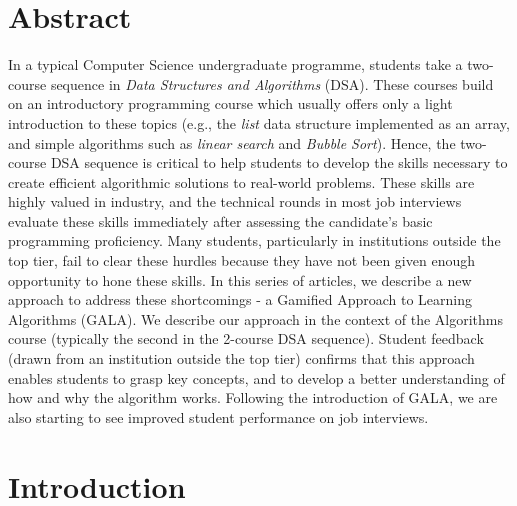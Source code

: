 \begin{multicols}{2}

\section*{Abstract}

In a typical Computer Science undergraduate programme, students take a two-course sequence in \textit{Data Structures and Algorithms} (DSA). These courses build on an introductory programming course which usually offers only a light introduction to these topics (e.g., the \textit{list} data structure implemented as an array, and simple algorithms such as \textit{linear search} and \textit{Bubble Sort}). Hence, the two-course DSA sequence is critical to help students to develop the skills necessary to create efficient algorithmic solutions to real-world problems. These skills are highly valued in industry, and the technical rounds in most job interviews evaluate these skills immediately after assessing the candidate's basic programming proficiency. Many students, particularly in institutions outside the top tier, fail to clear these hurdles because they have not been given enough opportunity to hone these skills. In this series of articles, we describe a new approach to address these shortcomings - a Gamified Approach to Learning Algorithms (GALA). We describe our approach in the context of the Algorithms course (typically the second in the 2-course DSA sequence). Student feedback (drawn from an institution outside the top tier) confirms that this approach enables students to grasp key concepts, and to develop a better understanding of how and why the algorithm works. Following the introduction of GALA, we are also starting to see improved student performance on job interviews.

\section{Introduction}\label{section-1}


\end{multicols}
